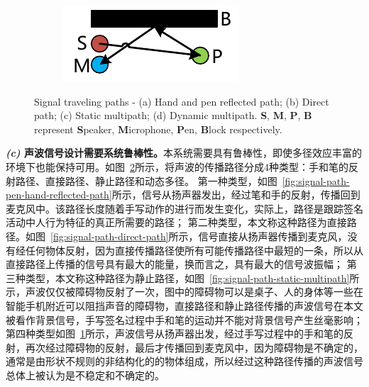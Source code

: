 \begin{figure}
\begin{subfigure}[b]{0.49\textwidth}
    \includegraphics[width=\textwidth]{figure/signal-path-dynamic-multipath}
    \caption{}
    \label{fig:signal-path-dynamic-multipath}
  \end{subfigure}
  {Signal traveling paths - (a) Hand and pen reflected path; (b) Direct path; (c) Static multipath; (d) Dynamic multipath. \textbf{S}, \textbf{M}, \textbf{P}, \textbf{B} represent \textbf{S}peaker, \textbf{M}icrophone, \textbf{P}en, \textbf{B}lock respectively.}
  \label{fig:signal-travel-paths}
\end{figure}

\textbf{\textit{(c)} 声波信号设计需要系统鲁棒性。}本系统需要具有鲁棒性，即使多径效应丰富的环境下也能保持可用。如图~\ref{fig:signal-travel-paths}所示，将声波的传播路径分成4种类型：手和笔的反射路径、直接路径、静止路径和动态多径。
第一种类型，如图~\ref{fig:signal-path-pen-hand-reflected-path}所示，信号从扬声器发出，经过笔和手的反射，传播回到麦克风中。该路径长度随着手写动作的进行而发生变化，实际上，路径是跟踪签名活动中人行为特征的真正所需要的路径；
第二种类型，本文称这种路径为直接路径。如图~\ref{fig:signal-path-direct-path}所示，信号直接从扬声器传播到麦克风，没有经任何物体反射，因为直接传播路径使所有可能传播路径中最短的一条，所以从直接路径上传播的信号具有最大的能量，换而言之，具有最大的信号波振幅；
第三种类型，本文称这种路径为静止路径，如图~\ref{fig:signal-path-static-multipath}所示，声波仅仅被障碍物反射了一次，图中的障碍物可以是桌子、人的身体等一些在智能手机附近可以阻挡声音的障碍物，直接路径和静止路径传播的声波信号在本文被看作背景信号，手写签名过程中手和笔的运动并不能对背景信号产生丝毫影响；
第四种类型如图~\ref{fig:signal-path-dynamic-multipath}所示，声波信号从扬声器出发，经过手写过程中的手和笔的反射，再次经过障碍物的反射，最后才传播回到麦克风中，因为障碍物是不确定的，通常是由形状不规则的非结构化的的物体组成，所以经过这种路径传播的声波信号总体上被认为是不稳定和不确定的。

